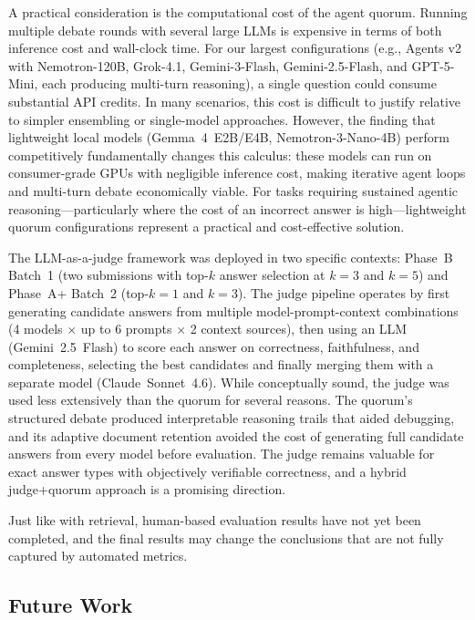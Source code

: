 A practical consideration is the computational cost of the agent quorum. Running multiple debate rounds with several large LLMs is expensive in terms of both inference cost and wall-clock time. For our largest configurations (e.g., Agents v2 with Nemotron-120B, Grok-4.1, Gemini-3-Flash, Gemini-2.5-Flash, and GPT-5-Mini, each producing multi-turn reasoning), a single question could consume substantial API credits. In many scenarios, this cost is difficult to justify relative to simpler ensembling or single-model approaches. However, the finding that lightweight local models (Gemma~4~E2B/E4B, Nemotron-3-Nano-4B) perform competitively fundamentally changes this calculus: these models can run on consumer-grade GPUs with negligible inference cost, making iterative agent loops and multi-turn debate economically viable. For tasks requiring sustained agentic reasoning—particularly where the cost of an incorrect answer is high—lightweight quorum configurations represent a practical and cost-effective solution.

The LLM-as-a-judge framework was deployed in two specific contexts: Phase~B Batch~1 (two submissions with top-$k$ answer selection at $k=3$ and $k=5$) and Phase~A+ Batch~2 (top-$k=1$ and $k=3$). The judge pipeline operates by first generating candidate answers from multiple model-prompt-context combinations (4 models $\times$ up to 6 prompts $\times$ 2 context sources), then using an LLM (Gemini~2.5~Flash) to score each answer on correctness, faithfulness, and completeness, selecting the best candidates and finally merging them with a separate model (Claude~Sonnet~4.6). While conceptually sound, the judge was used less extensively than the quorum for several reasons. The quorum's structured debate produced interpretable reasoning trails that aided debugging, and its adaptive document retention avoided the cost of generating full candidate answers from every model before evaluation. The judge remains valuable for exact answer types with objectively verifiable correctness, and a hybrid judge+quorum approach is a promising direction.

Just like with retrieval, human-based evaluation results have not yet been completed, and the final results may change the conclusions that are not fully captured by automated metrics.

\subsection{Future Work}

